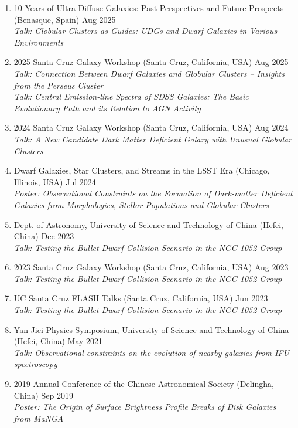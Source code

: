 \documentclass[letterpaper,11pt]{article}
\begin{document}
\begin{enumerate}[itemsep=0pt]
  {\em Talk: Puzzles of the Small: Diversity of Dwarf Galaxies and Their Globular Clusters Across Environments}
  \item[-] 10 Years of Ultra-Diffuse Galaxies: Past Perspectives and Future Prospects {\small (Benasque, Spain)} \hfill {Aug 2025}\\
  {\em Talk: Globular Clusters as Guides: UDGs and Dwarf Galaxies in Various Environments}
  \item[-] 2025 Santa Cruz Galaxy Workshop {\small (Santa Cruz, California, USA)} \hfill {Aug 2025}\\
  {\em Talk: Connection Between Dwarf Galaxies and Globular Clusters -- Insights from the Perseus Cluster}\\
  {\em Talk: Central Emission-line Spectra of SDSS Galaxies: The Basic Evolutionary Path and its Relation to AGN Activity}
  \item[-] 2024 Santa Cruz Galaxy Workshop {\small (Santa Cruz, California, USA)} \hfill {Aug 2024}\\
  {\em Talk: A New Candidate Dark Matter Deficient Galaxy with Unusual Globular Clusters}
  \item[-] Dwarf Galaxies, Star Clusters, and Streams in the LSST Era {\small (Chicago, Illinois, USA)} \hfill {Jul 2024}\\
  {\em Poster: Observational Constraints on the Formation of Dark-matter Deficient Galaxies from Morphologies, Stellar Populations and Globular Clusters}
  \item[-] Dept. of Astronomy, University of Science and Technology of China {\small (Hefei, China)} \hfill {Dec 2023}\\
  {\em Talk: Testing the Bullet Dwarf Collision Scenario in the NGC 1052 Group}
  \item[-] 2023 Santa Cruz Galaxy Workshop {\small (Santa Cruz, California, USA)} \hfill {Aug 2023}\\
  {\em Talk: Testing the Bullet Dwarf Collision Scenario in the NGC 1052 Group}
  \item[-] UC Santa Cruz FLASH Talks {\small (Santa Cruz, California, USA)} \hfill {Jun 2023}\\
  {\em Talk: Testing the Bullet Dwarf Collision Scenario in the NGC 1052 Group}
  \item[-] Yan Jici Physics Symposium, University of Science and Technology of China {\small (Hefei, China)} \hfill {May 2021}\\
  {\em Talk: Observational constraints on the evolution of nearby galaxies from IFU spectroscopy}
  \item[-] 2019 Annual Conference of the Chinese Astronomical Society {\small (Delingha, China)} \hfill {Sep 2019}\\
  {\em Poster: The Origin of Surface Brightness Profile Breaks of Disk Galaxies from MaNGA}
\end{enumerate}
\end{document}
